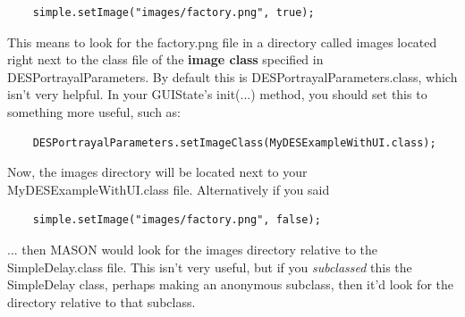 \documentclass[twoside,10pt]{article}
\newcommand\file[1]{\textsf{#1}}
\newcommand\method[1]{\hbox{\textsf{#1}}}
\begin{document}
\begin{verbatim}
    simple.setImage("images/factory.png", true);
\end{verbatim}

This means to look for the \file{factory.png} file in a directory called \file{images} located right next to the class file of the {\bf image class} specified in DESPortrayalParameters.  By default this is DESPortrayalParameters.class, which isn't very helpful.  In your GUIState's \method{init(...)} method, you should set this to something more useful, such as:

\begin{verbatim}
    DESPortrayalParameters.setImageClass(MyDESExampleWithUI.class);
\end{verbatim}

Now, the \file{images} directory will be located next to your MyDESExampleWithUI.class file.  Alternatively if you said 

\begin{verbatim}
    simple.setImage("images/factory.png", false);
\end{verbatim}

... then MASON would look for the \file{images} directory relative to the SimpleDelay.class file.  This isn't very useful, but if you {\it subclassed} this the SimpleDelay class, perhaps making an anonymous subclass, then it'd look for the directory relative to that subclass.
\end{document}
